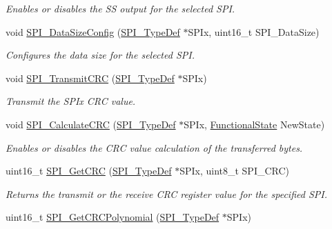\begin{DoxyCompactItemize}
\begin{DoxyCompactList}\small\item\em Enables or disables the SS output for the selected S\+PI. \end{DoxyCompactList}\item 
void \mbox{\hyperlink{group___s_p_i___private___functions_gafc82e90841d7879535d655c035709cb1}{S\+P\+I\+\_\+\+Data\+Size\+Config}} (\mbox{\hyperlink{struct_s_p_i___type_def}{S\+P\+I\+\_\+\+Type\+Def}} $\ast$S\+P\+Ix, uint16\+\_\+t S\+P\+I\+\_\+\+Data\+Size)
\begin{DoxyCompactList}\small\item\em Configures the data size for the selected S\+PI. \end{DoxyCompactList}\item 
void \mbox{\hyperlink{group___s_p_i___private___functions_gace8b1058e09bab150b0dbe5978810273}{S\+P\+I\+\_\+\+Transmit\+C\+RC}} (\mbox{\hyperlink{struct_s_p_i___type_def}{S\+P\+I\+\_\+\+Type\+Def}} $\ast$S\+P\+Ix)
\begin{DoxyCompactList}\small\item\em Transmit the S\+P\+Ix C\+RC value. \end{DoxyCompactList}\item 
void \mbox{\hyperlink{group___s_p_i___private___functions_ga64f7276d119e6cb58afc100f8832adb0}{S\+P\+I\+\_\+\+Calculate\+C\+RC}} (\mbox{\hyperlink{struct_s_p_i___type_def}{S\+P\+I\+\_\+\+Type\+Def}} $\ast$S\+P\+Ix, \mbox{\hyperlink{group___exported__types_gac9a7e9a35d2513ec15c3b537aaa4fba1}{Functional\+State}} New\+State)
\begin{DoxyCompactList}\small\item\em Enables or disables the C\+RC value calculation of the transferred bytes. \end{DoxyCompactList}\item 
uint16\+\_\+t \mbox{\hyperlink{group___s_p_i___private___functions_ga4c81c193516e82cf0a2fdc149ef20cc6}{S\+P\+I\+\_\+\+Get\+C\+RC}} (\mbox{\hyperlink{struct_s_p_i___type_def}{S\+P\+I\+\_\+\+Type\+Def}} $\ast$S\+P\+Ix, uint8\+\_\+t S\+P\+I\+\_\+\+C\+RC)
\begin{DoxyCompactList}\small\item\em Returns the transmit or the receive C\+RC register value for the specified S\+PI. \end{DoxyCompactList}\item 
uint16\+\_\+t \mbox{\hyperlink{group___s_p_i___private___functions_ga80fb9374cfce670f29128bb78568353f}{S\+P\+I\+\_\+\+Get\+C\+R\+C\+Polynomial}} (\mbox{\hyperlink{struct_s_p_i___type_def}{S\+P\+I\+\_\+\+Type\+Def}} $\ast$S\+P\+Ix)

\end{DoxyCompactItemize}
